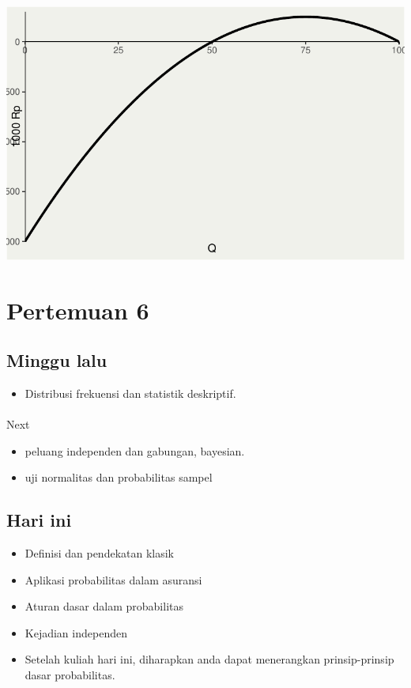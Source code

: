 \documentclass[
  letterpaper,
  DIV=11,
  numbers=noendperiod]{scrartcl}
\makeatletter
\let\oldparagraph\paragraph
\renewcommand{\paragraph}{
    \@ifstar
      \xxxParagraphStar
      \xxxParagraphNoStar
  }
\newcommand{\xxxParagraphStar}[1]{\oldparagraph*{#1}\mbox{}}
\newcommand{\xxxParagraphNoStar}[1]{\oldparagraph{#1}\mbox{}}
\providecommand{\tightlist}{%
  \setlength{\itemsep}{0pt}\setlength{\parskip}{0pt}}\usepackage{longtable,booktabs,array}
\makeatother
\begin{document}
\includegraphics{index_files/figure-pdf/unnamed-chunk-10-1.pdf}

\section{Pertemuan 6}\label{pertemuan-6}

\subsection{Minggu lalu}\label{minggu-lalu}

\begin{itemize}
\tightlist
\item
  Distribusi frekuensi dan statistik deskriptif.
\end{itemize}

\paragraph{Next}\label{next}

\begin{itemize}
\tightlist
\item
  peluang independen dan gabungan, bayesian.
\item
  uji normalitas dan probabilitas sampel
\end{itemize}

\subsection{Hari ini}\label{hari-ini}

\begin{itemize}
\item
  Definisi dan pendekatan klasik
\item
  Aplikasi probabilitas dalam asuransi
\item
  Aturan dasar dalam probabilitas
\item
  Kejadian independen
\item
  Setelah kuliah hari ini, diharapkan anda dapat menerangkan
  prinsip-prinsip dasar probabilitas.
\end{itemize}
\end{document}

